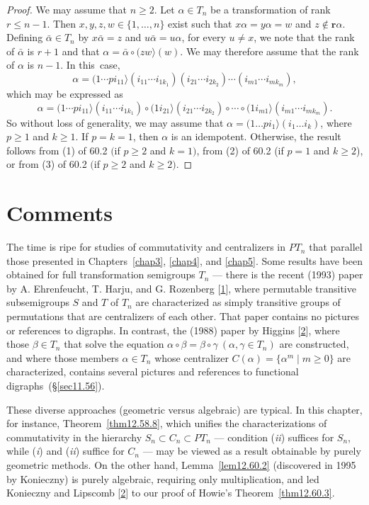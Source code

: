 \documentclass{surv-l}
\numberwithin{equation}{section}
\numberwithin{table}{section}
\numberwithin{figure}{section}
\theoremstyle{definition}
\begin{document}
\begin{proof} We may assume that $n \geq 2$. Let $\alpha\in T_{n}$ be a
transformation of rank $r\leq n-1$. Then $x, y, z, w\in\{1,\ldots,
n\}$ exist such that $x\alpha=y\alpha=w$ and $z\not\in
\mathbf{r}\alpha$. Defining $\bar{\alpha}\in T_{n}$ by
$x\bar{\alpha}=z$ and $ u\bar{\alpha}=u\alpha$, for every $u\neq
x$, we note that the rank of $\bar{\alpha}$ is $r+1$ and that
$\alpha=\bar{\alpha}\circ (zw\rangle(w)$. We may therefore assume
that the rank of $\alpha$ is $n -1$. In this~case,
\[
\alpha=(1\cdots pi_{11}\rangle(i_{11}\cdots i_{1k_{1}})(i_{21}\cdots i_{2k_{2}})\cdots(i_{m1}\cdots i_{mk_{m}}),
\]
which may be expressed as
\[
\alpha=(1\cdots pi_{11}\rangle(i_{11}\cdots i_{1k_{1}})\circ
(1i_{21}\rangle(i_{21}\cdots i_{2k_{2}})\circ\cdots \circ
(1i_{m1}\rangle(i_{m1}\cdots i_{mk_{m}}).
\]
So without loss of generality, we may assume that
$\alpha=(1\ldots pi_{1}\rangle(i_{1}\ldots i_{k})$, where
$p\geq 1$ and $k\geq 1$. If $p=k=1$, then $\alpha$ is an
idempotent. Otherwise, the result follows from (1) of 60.2
$($if $p\geq 2$ and $k=1)$, from (2) of 60.2 (if $p=1$ and
$k\geq 2$), or from (3) of 60.2 $($if $p\geq 2$ and $k\geq
2).$
\end{proof}

\section{Comments}\label{sec12.61}

The time is ripe for studies of commutativity and centralizers in
$PT_{n}$ that parallel those presented in Chapters~\ref{chap3},
\ref{chap4}, and \ref{chap5}. Some results have been obtained for
full transformation semigroups $T_{n}$ --- there is the recent
(1993) paper by A. Ehrenfeucht, T.
Harju, and G. Rozenberg
[\hyperlink{bib13}{1}], where permutable transitive
subsemigroups $S$ and $T$ of $T_{n}$ are characterized as simply
transitive groups of permutations that are centralizers of each
other. That paper contains no pictures or references to digraphs.
In contrast, the (1988) paper by Higgins
[\hyperlink{bib28a}{2}], where those $\beta\in T_{n}$
that solve the equation $\alpha \circ\beta=\beta
\circ\gamma\ (\alpha,\gamma\in T_{n})$ are constructed, and where
those members $\alpha\in T_{n}$ whose centralizer
$C(\alpha)=\{\alpha^{m}\mid m\geq 0\}$ are characterized,
contains several pictures and references to functional
digraphs~(\S\ref{sec11.56}).

These diverse approaches (geometric versus algebraic) are typical.
In this chapter, for instance, Theorem~\ref{thm12.58.8}, which
unifies the characterizations of commutativity in the hierarchy
$S_{n}\subset C_{n}\subset PT_{n}$ --- condition (\emph{ii})
suffices for $S_{n}$, while (\emph{i}) and (\emph{ii}) suffice for
$C_{n}$
--- may be viewed as a result obtainable by purely geometric
methods. On the other hand, Lemma~\ref{lem12.60.2} (discovered in
1995 by Konieczny) is purely algebraic,
requiring only multiplication, and led Konieczny and Lipscomb [\hyperlink{bib37a}{2}] to our proof of
Howie's Theorem~\ref{thm12.60.3}.
\end{document}

